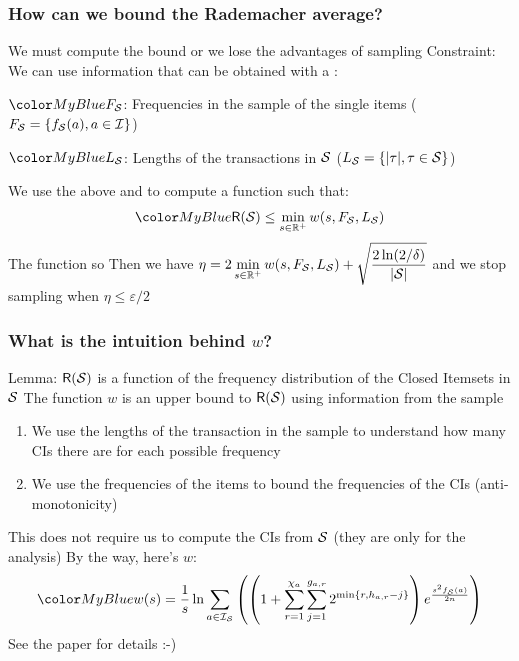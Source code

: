 \begin{frame}
  \frametitle{How can we bound the Rademacher average?}
  We must compute the bound  or we lose the advantages of sampling
  \vfill
  Constraint: We can use  information that can be obtained with a
  :\\
  \begin{enumerate*}
    \item $\inblue{F_\Sam}$: Frequencies in the sample of the single items ($F_{\cal S}=\{f_{\cal S}(a),
      a\in\mathcal{I}\}$)
    \item $\inblue{L_\Sam}$: Lengths of the transactions in ${\cal S}$ ($L_{\cal S}=\{|\tau|, \tau\in{\cal S}\}$)
  \end{enumerate*}
  \vfill
  We use the above and  to compute a
  function  such that:
  \[
    \inblue{
    \Rade(\Sam)\le \min_{s\in\mathbb{R}^+} w(s,F_\Sam,L_\Sam)
    }
  \]
  The function  so 
  \vfill
  Then we have $\eta= 2 \displaystyle\min_{s\in\mathbb{R}^+} w(s,F_{\cal S},L_{\cal S}) +
  \displaystyle\sqrt{\frac{2\ln(2/\delta)}{|{\cal S}|}}$ and we stop sampling when
  $\eta\le\varepsilon/2$
\end{frame}

\begin{frame}
  \frametitle{What is the intuition behind $w$?}
  Lemma: $\mathsf{R}({\cal S})$ is a function of the frequency distribution of the
  Closed Itemsets in ${\cal S}$
  \vfill
  The function $w$ is an upper bound to $\mathsf{R}({\cal S})$ using information from the sample
  \begin{enumerate}
    \item We use the lengths of the transaction in the sample to understand
      how many CIs there are for each possible frequency
    \item We use the frequencies of the items to bound the frequencies of
      the CIs (anti-monotonicity)
  \end{enumerate}
  This does not require us to compute the CIs from ${\cal S}$ (they are only for the
  analysis)
  \vfill
  \pause
  By the way, here's $w$:
  \[
    \inblue{
    w(s) =
    \frac{1}{s}\ln\displaystyle\sum_{a\in\mathcal{I}_\Sam}\left(\left(1+\displaystyle\sum_{r=1}^{\chi_a}\displaystyle\sum_{j=1}^{g_{a,r}}2^{\min\{r,h_{a,r}-j\}}\right)e^{\frac{s^2f_\Sam(a)}{2n}}\right)
    }
  \]
  See the paper for details :-)
\end{frame}

